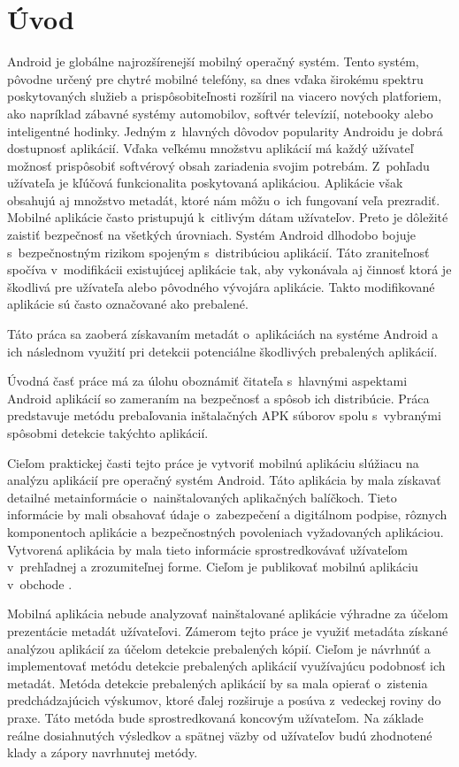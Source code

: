 \chapter*{Úvod}
 Android je globálne najrozšírenejší mobilný operačný systém. Tento systém, pôvodne určený pre chytré mobilné telefóny, sa dnes vďaka širokému spektru poskytovaných služieb a prispôsobiteľnosti rozšíril na viacero nových platforiem, ako napríklad zábavné systémy automobilov, softvér televízií, notebooky alebo inteligentné hodinky. Jedným z~hlavných dôvodov popularity Androidu je dobrá dostupnosť aplikácií. Vďaka veľkému množstvu aplikácií má každý užívateľ možnosť prispôsobiť softvérový obsah zariadenia svojim potrebám. Z~pohľadu užívateľa je kľúčová funkcionalita poskytovaná aplikáciou. Aplikácie však obsahujú aj množstvo metadát, ktoré nám môžu o~ich fungovaní veľa prezradiť. Mobilné aplikácie často pristupujú k~citlivým dátam užívateľov. Preto je dôležité zaistiť bezpečnosť na všetkých úrovniach. Systém Android dlhodobo bojuje s~bezpečnostným rizikom spojeným s~distribúciou aplikácií. Táto zraniteľnosť spočíva v~modifikácii existujúcej aplikácie tak, aby vykonávala aj činnosť ktorá je škodlivá pre užívateľa alebo pôvodného vývojára aplikácie. Takto modifikované aplikácie sú často označované ako prebalené.

Táto práca sa zaoberá získavaním metadát o~aplikáciách na systéme Android a ich následnom využití pri detekcii potenciálne škodlivých prebalených aplikácií.

Úvodná časť práce má za úlohu oboznámiť čitateľa s~hlavnými aspektami Android aplikácií so zameraním na bezpečnosť a spôsob ich distribúcie. Práca predstavuje metódu prebaľovania inštalačných APK súborov spolu s~vybranými spôsobmi detekcie takýchto aplikácií.

Cieľom praktickej časti tejto práce je vytvoriť mobilnú aplikáciu slúžiacu na analýzu aplikácií pre operačný systém Android. Táto aplikácia by mala získavať detailné metainformácie o~nainštalovaných aplikačných balíčkoch. Tieto informácie by mali obsahovať údaje o~zabezpečení a digitálnom podpise, rôznych komponentoch aplikácie a bezpečnostných povoleniach vyžadovaných aplikáciou. Vytvorená aplikácia by mala tieto informácie sprostredkovávať užívateľom v~prehľadnej a zrozumiteľnej forme. Cieľom je publikovať mobilnú aplikáciu v~obchode .

Mobilná aplikácia nebude analyzovať nainštalované aplikácie výhradne za účelom prezentácie metadát užívateľovi. Zámerom tejto práce je využiť metadáta získané analýzou aplikácií za účelom detekcie prebalených kópií. Cieľom je návrhnúť a implementovať metódu detekcie prebalených aplikácií využívajúcu podobnosť ich metadát. Metóda detekcie prebalených aplikácií by sa mala opierať o~zistenia predchádzajúcich výskumov, ktoré ďalej rozširuje a posúva z~vedeckej roviny do praxe. Táto metóda bude sprostredkovaná koncovým užívateľom. Na základe reálne dosiahnutých výsledkov a spätnej väzby od užívateľov budú zhodnotené klady a zápory navrhnutej metódy.

